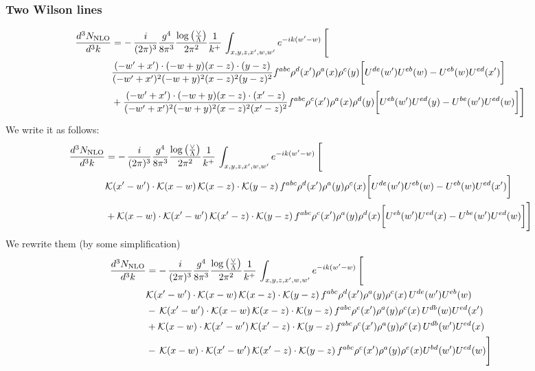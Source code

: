\documentclass[aps,prd,amsmath,amssymb,nofootinbib]{revtex4-2}
\numberwithin{equation}{section}
\begin{document}
\subsubsection{Two Wilson lines}
\begin{align}
    \frac{d^{3}N_{\rm NLO}}{d^{3}k} & = -\,\frac{i}{(2\pi)^{3}}\frac{g^{4}}{8\pi^{3}}\frac{\log{\left(\frac{\vee}{\Lambda}\right)}}{2\pi^{2}} \frac{1}{k^{+}}\,\int_{x,y,z,x^{\prime},w,w^{\prime}}e^{-ik(w^{\prime}-w)}\, \Bigg[\notag \\ &  \frac{( - w' + x') \cdot ( - w + y) (x - z) \cdot (y - z)}{( - w' + x')^{2} ( - w + y)^{2} (x - z)^{2} (y - z)^{2}} f^{a b c} \rho^{d}(x') \rho^{a}(x) \rho^{c}(y) \bigg[U^{d e}(w') U^{e b}(w) - U^{e b}(w) U^{e d}(x')\bigg]\nonumber\\
    & + \frac{( - w' + x') \cdot ( - w + y) (x - z) \cdot (x' - z)}{( - w' + x')^{2} ( - w + y)^{2} (x - z)^{2} (x' - z)^{2}} f^{a b c} \rho^{c}(x') \rho^{a}(x) \rho^{d}(y) \bigg[U^{e b}(w') U^{e d}(y) - U^{b e}(w') U^{e d}(w) \bigg]\Bigg]
\end{align}
We write it as follows:
\begin{align}
    \frac{d^{3}N_{\rm NLO}}{d^{3}k} & = -\,\frac{i}{(2\pi)^{3}}\frac{g^{4}}{8\pi^{3}}\frac{\log{\left(\frac{\vee}{\Lambda}\right)}}{2\pi^{2}} \frac{1}{k^{+}}\,\int_{x,y,z,x^{\prime},w,w^{\prime}}e^{-ik(w^{\prime}-w)}\, \Bigg[\notag \\ &  \mathcal{K}(x'-w')\cdot \mathcal{K}(x-w)\, \mathcal{K}(x-z)\cdot \mathcal{K}(y-z)\, f^{a b c} \rho^{d}(x') \rho^{a}(y) \rho^{c}(x) \bigg[U^{d e}(w') U^{e b}(w) - U^{e b}(w) U^{e d}(x')\bigg]\nonumber\\
    & + \mathcal{K}(x-w)\cdot \mathcal{K}(x'-w')\, \mathcal{K}(x'-z)\cdot \mathcal{K}(y-z)\, f^{a b c} \rho^{c}(x') \rho^{a}(y) \rho^{d}(x) \bigg[U^{e b}(w') U^{e d}(x) - U^{b e}(w') U^{e d}(w) \bigg]\Bigg]
\end{align}
We rewrite them (by some simplification)
\begin{align}
    \frac{d^{3}N_{\rm NLO}}{d^{3}k} & = -\,\frac{i}{(2\pi)^{3}}\frac{g^{4}}{8\pi^{3}}\frac{\log{\left(\frac{\vee}{\Lambda}\right)}}{2\pi^{2}} \frac{1}{k^{+}}\,\int_{x,y,z,x^{\prime},w,w^{\prime}}e^{-ik(w^{\prime}-w)}\, \Bigg[\notag \\ &  \mathcal{K}(x'-w')\cdot \mathcal{K}(x-w)\, \mathcal{K}(x-z)\cdot \mathcal{K}(y-z)\, f^{a b c} \rho^{d}(x') \rho^{a}(y) \rho^{c}(x)\,U^{d e}(w') U^{e b}(w) \nonumber\\
    &  -\,\mathcal{K}(x'-w')\cdot \mathcal{K}(x-w)\, \mathcal{K}(x-z)\cdot \mathcal{K}(y-z)\, f^{a b c} \rho^{e}(x') \rho^{a}(y) \rho^{c}(x)\, U^{d b}(w) U^{e d}(x')\nonumber\\
    & + \mathcal{K}(x-w)\cdot \mathcal{K}(x'-w')\, \mathcal{K}(x'-z)\cdot \mathcal{K}(y-z)\, f^{a b c} \rho^{c}(x') \rho^{a}(y) \rho^{e}(x)\,U^{d b}(w') U^{e d}(x) \nonumber\\
    & -\,\mathcal{K}(x-w)\cdot \mathcal{K}(x'-w')\, \mathcal{K}(x'-z)\cdot \mathcal{K}(y-z)\, f^{a b c} \rho^{c}(x') \rho^{a}(y) \rho^{e}(x) U^{b d}(w') U^{e d}(w)\Bigg]
\end{align}
\end{document}
